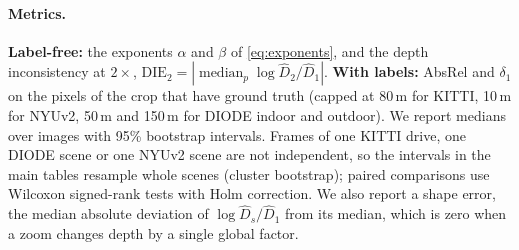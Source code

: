 \paragraph{Metrics.}
\textbf{Label-free:} the exponents $\alpha$ and $\beta$ of \cref{eq:exponents}, and the depth
inconsistency at $2\times$, $\mathrm{DIE}_2=|\operatorname{median}_p \log
\hat D_2/\hat D_1|$. \textbf{With labels:} AbsRel and $\delta_1$ on the pixels of the crop
that have ground truth (capped at 80\,m for KITTI, 10\,m for NYUv2, 50\,m and 150\,m for
DIODE indoor and outdoor). We report medians over images with 95\% bootstrap intervals. Frames of one KITTI drive, one
DIODE scene or one NYUv2 scene are not independent, so the intervals in the main tables resample
whole scenes (cluster bootstrap); paired comparisons use Wilcoxon signed-rank tests with Holm
correction. We also report a shape error, the median absolute deviation of
$\log \hat D_s/\hat D_1$ from its median, which is zero when a zoom changes depth by a single global
factor.
